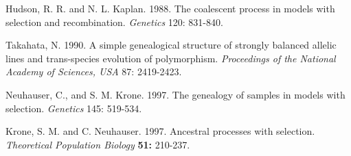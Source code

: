 \begin{thebibliography}{20}
Hudson, R. R. and N. L. Kaplan.  1988.  The coalescent process in models
with selection and recombination.  {\it Genetics}  120: 831-840.

Takahata, N.  1990.  A simple genealogical structure of strongly balanced
allelic lines and trans-species evolution of polymorphism.
{\it Proceedings of the National Academy of Sciences, USA}  87: 2419-2423.

Neuhauser, C., and S. M. Krone. 1997.  The genealogy of samples in models
with selection.  {\it Genetics} 145: 519-534.

Krone, S. M. and C. Neuhauser.  1997.  Ancestral processes with selection.
{\it Theoretical Population Biology} {\bf 51:} 210-237.

\end{thebibliography}



